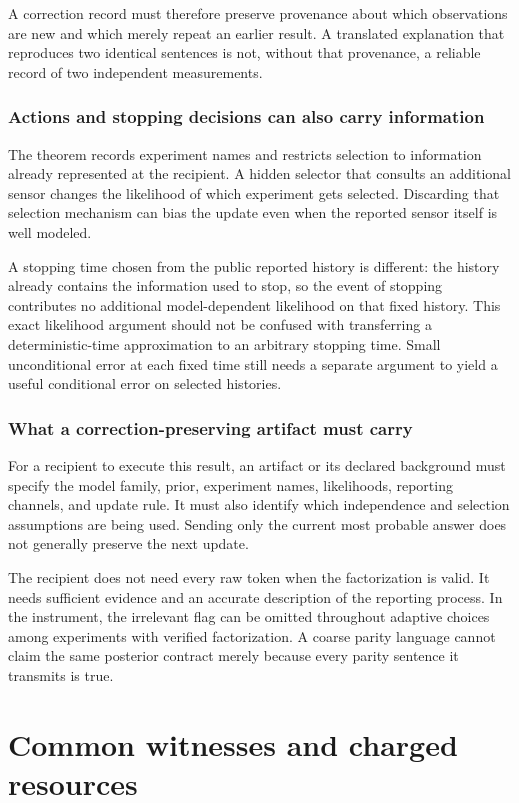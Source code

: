 A correction record must therefore preserve provenance about which observations are new and which merely repeat an earlier result. A translated explanation that reproduces two identical sentences is not, without that provenance, a reliable record of two independent measurements.

\subsection{Actions and stopping decisions can also carry information}
The theorem records experiment names and restricts selection to information already represented at the recipient. A hidden selector that consults an additional sensor changes the likelihood of which experiment gets selected. Discarding that selection mechanism can bias the update even when the reported sensor itself is well modeled.

A stopping time chosen from the public reported history is different: the history already contains the information used to stop, so the event of stopping contributes no additional model-dependent likelihood on that fixed history. This exact likelihood argument should not be confused with transferring a deterministic-time approximation to an arbitrary stopping time. Small unconditional error at each fixed time still needs a separate argument to yield a useful conditional error on selected histories.

\subsection{What a correction-preserving artifact must carry}
For a recipient to execute this result, an artifact or its declared background must specify the model family, prior, experiment names, likelihoods, reporting channels, and update rule. It must also identify which independence and selection assumptions are being used. Sending only the current most probable answer does not generally preserve the next update.

The recipient does not need every raw token when the factorization is valid. It needs sufficient evidence and an accurate description of the reporting process. In the instrument, the irrelevant flag can be omitted throughout adaptive choices among experiments with verified factorization. A coarse parity language cannot claim the same posterior contract merely because every parity sentence it transmits is true.



\chapter{Common witnesses and charged resources}\label{MU:book:chapter-48}


